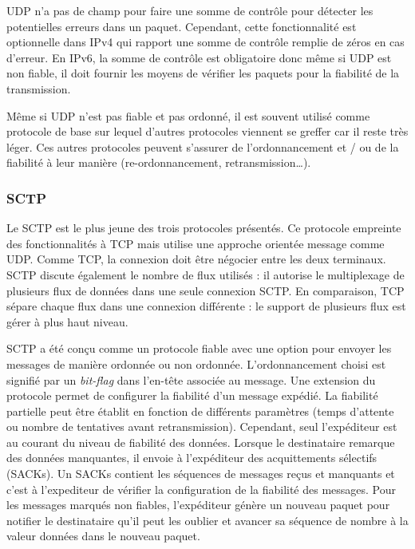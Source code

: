 \gls{UDP} n'a pas de champ pour faire une somme de contrôle pour détecter les 
potentielles erreurs dans un paquet. Cependant, cette fonctionnalité est optionnelle 
dans IPv4 qui rapport une somme de contrôle remplie de zéros en cas d'erreur. En 
IPv6, la somme de contrôle est obligatoire donc même si \gls{UDP} est non fiable, 
il doit fournir les moyens de vérifier les paquets pour la fiabilité de 
la transmission.

Même si \gls{UDP} n'est pas fiable et pas ordonné, il est souvent utilisé comme 
protocole de base sur lequel d'autres protocoles viennent se greffer car il reste très 
léger. Ces autres protocoles peuvent s'assurer de l'ordonnancement et / ou de la 
fiabilité à leur manière (re-ordonnancement, retransmission\dots). 

\subsubsection{SCTP}
Le \gls{SCTP} est le plus jeune des trois protocoles présentés. Ce protocole 
empreinte des fonctionnalités à \gls{TCP} mais utilise une approche orientée 
message comme \gls{UDP}. Comme \gls{TCP}, la connexion doit être négocier 
entre les deux terminaux. \gls{SCTP} discute également le nombre de flux utilisés 
: il autorise le multiplexage de plusieurs flux de données dans une seule 
connexion \gls{SCTP}. En comparaison, \gls{TCP} sépare chaque flux dans une 
connexion différente : le support de plusieurs flux est gérer à plus haut niveau.

\gls{SCTP} a été conçu comme un protocole fiable avec une option pour envoyer 
les messages de manière ordonnée ou non ordonnée. L'ordonnancement choisi est 
signifié par un \textit{bit-flag} dans l'en-tête associée au message. Une extension 
du protocole permet de configurer la fiabilité d'un message expédié. La fiabilité 
partielle peut être établit en fonction de différents paramètres (temps d'attente ou 
nombre de tentatives 
avant retransmission). Cependant, seul l'expéditeur est au courant du niveau de 
fiabilité des données. Lorsque le destinataire remarque des données manquantes, 
il envoie à l'expéditeur des acquittements sélectifs (SACKs). Un SACKs contient 
les séquences de messages reçus et manquants et c'est à l'expediteur de vérifier 
la configuration de la fiabilité des messages. Pour les messages marqués non 
fiables, l'expéditeur génère un nouveau paquet pour notifier le destinataire qu'il 
peut les \og oublier\fg{} et avancer sa séquence de nombre à la valeur données 
dans le nouveau paquet. 

